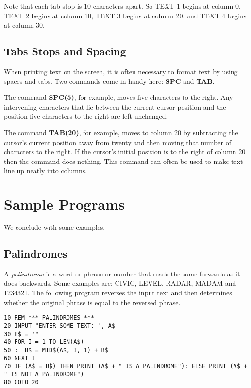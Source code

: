 Note that each tab stop is 10 characters apart. So TEXT 1 begins at column 0, TEXT 2 begins at column 10, TEXT 3 begins at column 20, and TEXT 4 begins at column 30.

\subsection{Tabs Stops and Spacing}
When printing text on the screen, it is often necessary to format text by using spaces and tabs. Two commands come in handy here: {\bf SPC} and {\bf TAB}.

The command {\bf SPC(5)}, for example, moves five characters to the right. Any intervening characters that lie between the current cursor position and the position five characters to the right are left unchanged.

The command {\bf TAB(20)}, for example, moves to column 20 by subtracting the cursor's current position away from twenty and then moving that number of characters to the right. If the cursor's initial position is to the right of column 20 then the command does nothing. This command can often be used to make text line up neatly into columns.

\section{Sample Programs}

We conclude with some examples.

\subsection{Palindromes}

A {\it palindrome} is a word or phrase or number that reads the same forwards as it does backwards. Some examples are: CIVIC, LEVEL, RADAR, MADAM and 1234321. The following program reverses the input text and then determines whether the original phrase is equal to the reversed phrase.

\begin{tcolorbox}[colback=black,coltext=white]
\verbatimfont{\codefont}
\begin{verbatim}
10 REM *** PALINDROMES ***
20 INPUT "ENTER SOME TEXT: ", A$
30 B$ = ""
40 FOR I = 1 TO LEN(A$)
50 :  B$ = MID$(A$, I, 1) + B$
60 NEXT I
70 IF (A$ = B$) THEN PRINT (A$ + " IS A PALINDROME"): ELSE PRINT (A$ + " IS NOT A PALINDROME")
80 GOTO 20
\end{verbatim}
\end{tcolorbox}


